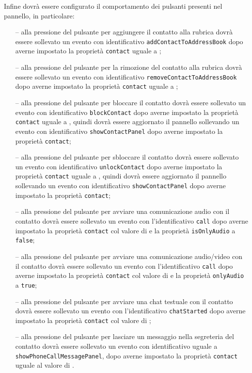 \begin{description}
  Infine dovrà essere configurato il comportamento dei pulsanti presenti nel pannello, in particolare:
  \begin{itemize}
    \item[--] alla pressione del pulsante per aggiungere il contatto alla rubrica dovrà essere sollevato un evento con identificativo \verb'addContactToAddressBook' dopo averne impostato la proprietà \verb'contact' uguale a ;
    \item[--] alla pressione del pulsante per la rimozione del contatto alla rubrica dovrà essere sollevato un evento con identificativo \verb'removeContactToAddressBook' dopo averne impostato la proprietà \verb'contact' uguale a ;
    \item[--] alla pressione del pulsante per bloccare il contatto dovrà essere sollevato un evento con identificativo \verb'blockContact' dopo averne impostato la proprietà \verb'contact' uguale a , quindi dovrà essere aggiornato il pannello sollevando un evento con identificativo \verb'showContactPanel' dopo averne impostato la proprietà \verb'contact';
    \item[--] alla pressione del pulsante per sbloccare il contatto dovrà essere sollevato un evento con identificativo \verb'unlockContact' dopo averne impostato la proprietà \verb'contact' uguale a , quindi dovrà essere aggiornato il pannello sollevando un evento con identificativo \verb'showContactPanel' dopo averne impostato la proprietà \verb'contact';
    \item[--] alla pressione del pulsante per avviare una comunicazione audio con il contatto dovrà essere sollevato un evento con l'identificativo \verb'call' dopo averne impostato la proprietà \verb'contact' col valore di  e la proprietà \verb'isOnlyAudio' a \verb'false';
    \item[--] alla pressione del pulsante per avviare una comunicazione audio/video con il contatto dovrà essere sollevato un evento con l'identificativo \verb'call' dopo averne impostato la proprietà \verb'contact' col valore di  e la proprietà \verb'onlyAudio' a \verb'true';
    \item[--] alla pressione del pulsante per avviare una chat testuale con il contatto dovrà essere sollevato un evento con l'identificativo \verb'chatStarted' dopo averne impostato la proprietà \verb'contact' col valore di ;
    \item[--] alla pressione del pulsante per lasciare un messaggio nella segreteria del contatto dovrà essere sollevato un evento con identificativo uguale a \verb'showPhoneCallMessagePanel', dopo averne impostato la proprietà \verb'contact' uguale al valore di .
  \end{itemize}
  

\end{description}

